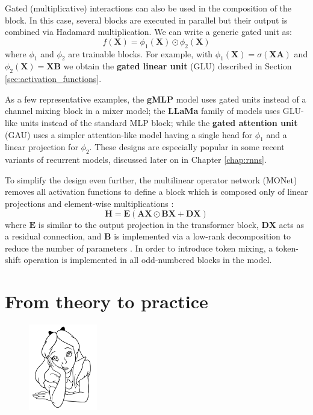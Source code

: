 Gated (multiplicative) interactions can also be used in the composition of the block. In this case, several blocks are executed in parallel but their output is combined via Hadamard multiplication. We can write a generic gated unit as:
%
\begin{equation}
f(\mathbf{X}) =\phi_1(\mathbf{X})\odot \phi_2(\mathbf{X})
\label{eq:glu_again}
\end{equation}
%
where $\phi_1$ and $\phi_2$ are trainable blocks. For example, with $\phi_1(\mathbf{X}) = \sigma(\mathbf{X}\mathbf{A})$ and $\phi_2(\mathbf{X})=\mathbf{X}\mathbf{B}$ we obtain the \textbf{gated linear unit} (GLU) described in Section \ref{sec:activation_functions}.

As a few representative examples, the \textbf{gMLP} model \cite{liu2021pay} uses
gated units instead of a channel mixing block in a mixer model; the \textbf{LLaMa} family of models \cite{touvron2023llama} uses GLU-like units instead of the standard MLP block; while the \textbf{gated attention unit} (GAU) \cite{hua2022transformer} uses a simpler attention-like model having a single head for $\phi_1$ and a linear projection for $\phi_2$. These designs are especially popular in some recent variants of recurrent models, discussed later on in Chapter \ref{chap:rnns}.

To simplify the design even further, the multilinear operator network (MONet) removes all activation functions to define a block which is composed only of linear projections and element-wise multiplications \cite{cheng2024multilinear}:
%
$$
\mathbf{H}=\mathbf{E}(\mathbf{A}\mathbf{X}\odot\mathbf{B}\mathbf{X}+\mathbf{D}\mathbf{X})
$$
%
where $\mathbf{E}$ is similar to the output projection in the transformer block, $\mathbf{D}\mathbf{X}$ acts as a residual connection, and $\mathbf{B}$ is implemented via a low-rank decomposition to reduce the number of parameters \cite{cheng2024multilinear}. In order to introduce token mixing, a token-shift operation is implemented in all odd-numbered blocks in the model.

\newpage
\section*{From theory to practice}

\begin{figure}
\vspace{-6em}\includegraphics[width=3.0cm]{images/shutterstock_2075221579.jpg}
\vspace{-2em}
\end{figure}

